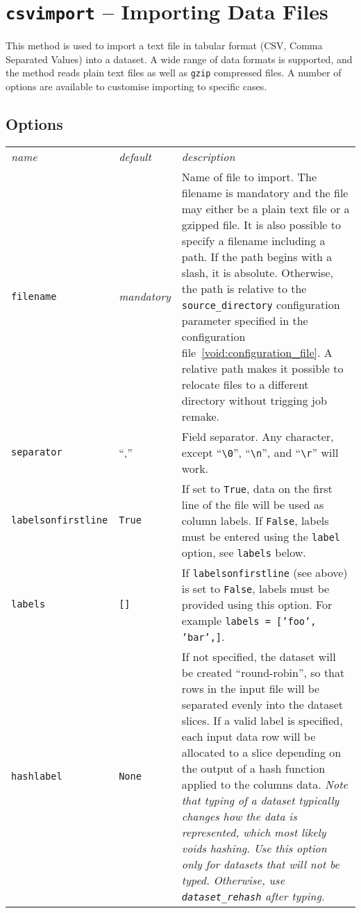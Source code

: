 \section{\texttt{csvimport} -- Importing Data Files}

This method is used to import a text file in tabular format (CSV,
Comma Separated Values) into a dataset.  A wide range of data formats
is supported, and the method reads plain text files as well as
\texttt{gzip} compressed files.  A number of options are available to
customise importing to specific cases.


\subsection{Options}

\begin{tabular}{ p{3.2cm} p{1.8cm} p{10cm}}
  \textsl{name} & \textsl{default} & \textsl{description}\\[2ex]

  \texttt{filename} & \emph{mandatory} & Name of file to import.  The
  filename is mandatory and the file may either be a plain text file
  or a gzipped file.  It is also possible to specify a filename
  including a path.  If the path begins with a slash, it is absolute.
  Otherwise, the path is relative to the \texttt{source\_directory}
  configuration parameter specified in the configuration
  file~\ref{void:configuration_file}.  A relative path makes it
  possible to relocate files to a different directory without trigging
  job remake.\\[1ex]
  
  \texttt{separator} & ``,'' & Field separator.  Any character, except
  ``\verb$\0$'', ``\verb$\n$'', and ``\verb$\r$'' will work.\\[1ex]

  \texttt{labelsonfirstline} & \texttt{True} & If set to
  \texttt{True}, data on the first line of the file will be used as
  column labels.  If \texttt{False}, labels must be entered using the
  \texttt{label} option, see \texttt{labels} below.\\[1ex]

  \texttt{labels} & \texttt{[]} & If \texttt{labelsonfirstline} (see
  above) is set to \texttt{False}, labels must be provided using this
  option.  For example \texttt{labels =
    ['foo', 'bar',]}.\\[1ex]

  \texttt{hashlabel} & \texttt{None} & If not specified, the dataset
  will be created ``round-robin'', so that rows in the input file will
  be separated evenly into the dataset slices.  If a valid label is
  specified, each input data row will be allocated to a slice
  depending on the output of a hash function applied to the columns
  data.  \textsl{Note that typing of a dataset typically changes how
    the data is represented, which most likely voids hashing.  Use
    this option only for datasets that will not be typed.  Otherwise,
    use \texttt{dataset\_rehash} after typing.}\\[1ex]


\end{tabular}
